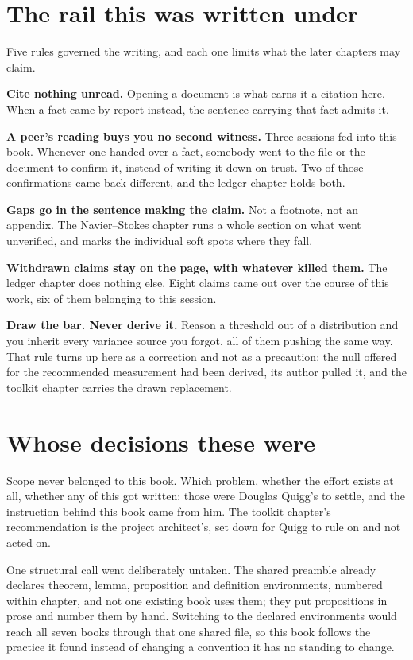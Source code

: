 \section{The rail this was written under}

Five rules governed the writing, and each one limits what the later chapters may claim.

\textbf{Cite nothing unread.} Opening a document is what earns it a citation here. When a fact came
by report instead, the sentence carrying that fact admits it.

\textbf{A peer's reading buys you no second witness.} Three sessions fed into this book. Whenever
one handed over a fact, somebody went to the file or the document to confirm it, instead of writing
it down on trust. Two of those confirmations came back different, and the ledger chapter holds both.

\textbf{Gaps go in the sentence making the claim.} Not a footnote, not an appendix. The
Navier--Stokes chapter runs a whole section on what went unverified, and marks the individual soft
spots where they fall.

\textbf{Withdrawn claims stay on the page, with whatever killed them.} The ledger chapter does
nothing else. Eight claims came out over the course of this work, six of them belonging to this
session.

\textbf{Draw the bar. Never derive it.} Reason a threshold out of a distribution and you inherit
every variance source you forgot, all of them pushing the same way. That rule turns up here as a
correction and not as a precaution: the null offered for the recommended measurement had been
derived, its author pulled it, and the toolkit chapter carries the drawn replacement.

\section{Whose decisions these were}

Scope never belonged to this book. Which problem, whether the effort exists at all, whether any of
this got written: those were Douglas Quigg's to settle, and the instruction behind this book came
from him. The toolkit chapter's recommendation is the project architect's, set down for Quigg to
rule on and not acted on.

One structural call went deliberately untaken. The shared preamble already declares theorem, lemma,
proposition and definition environments, numbered within chapter, and not one existing book uses
them; they put propositions in prose and number them by hand. Switching to the declared environments
would reach all seven books through that one shared file, so this book follows the practice it found
instead of changing a convention it has no standing to change.
